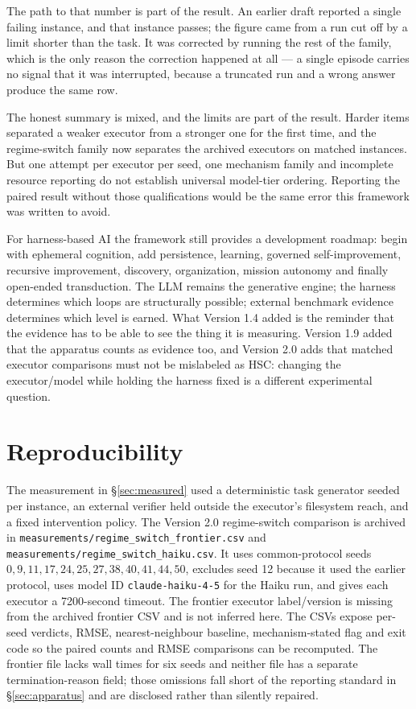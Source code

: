 \documentclass[11pt]{article}
\theoremstyle{definition}
\begin{document}
The path to that number is part of the result. An earlier draft reported a single failing instance, and that instance passes; the figure came from a run cut off by a limit shorter than the task. It was corrected by running the rest of the family, which is the only reason the correction happened at all --- a single episode carries no signal that it was interrupted, because a truncated run and a wrong answer produce the same row.

The honest summary is mixed, and the limits are part of the result. Harder items separated a weaker executor from a stronger one for the first time, and the regime-switch family now separates the archived executors on matched instances. But one attempt per executor per seed, one mechanism family and incomplete resource reporting do not establish universal model-tier ordering. Reporting the paired result without those qualifications would be the same error this framework was written to avoid.

For harness-based AI the framework still provides a development roadmap: begin with ephemeral cognition, add persistence, learning, governed self-improvement, recursive improvement, discovery, organization, mission autonomy and finally open-ended transduction. The LLM remains the generative engine; the harness determines which loops are structurally possible; external benchmark evidence determines which level is earned. What Version 1.4 added is the reminder that the evidence has to be able to see the thing it is measuring. Version 1.9 added that the apparatus counts as evidence too, and Version 2.0 adds that matched executor comparisons must not be mislabeled as HSC: changing the executor/model while holding the harness fixed is a different experimental question.

\section*{Reproducibility}

The measurement in \S\ref{sec:measured} used a deterministic task generator seeded per instance, an external verifier held outside the executor's filesystem reach, and a fixed intervention policy. The Version 2.0 regime-switch comparison is archived in \texttt{measurements/regime\_switch\_frontier.csv} and \texttt{measurements/regime\_switch\_haiku.csv}. It uses common-protocol seeds $0,9,11,17,24,25,27,38,40,41,44,50$, excludes seed 12 because it used the earlier protocol, uses model ID \texttt{claude-haiku-4-5} for the Haiku run, and gives each executor a 7200-second timeout. The frontier executor label/version is missing from the archived frontier CSV and is not inferred here. The CSVs expose per-seed verdicts, RMSE, nearest-neighbour baseline, mechanism-stated flag and exit code so the paired counts and RMSE comparisons can be recomputed. The frontier file lacks wall times for six seeds and neither file has a separate termination-reason field; those omissions fall short of the reporting standard in \S\ref{sec:apparatus} and are disclosed rather than silently repaired.
\end{document}
